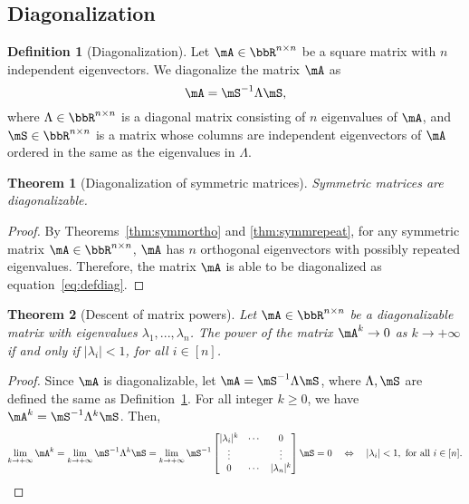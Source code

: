 \documentclass[11pt]{article}
\theoremstyle{plain}
\newtheorem{thm}{Theorem}[section]
\theoremstyle{definition}
\newtheorem{defn}{Definition}
\begin{document}
\subsection{Diagonalization}

\begin{defn}[Diagonalization]\label{def:diagonalization}
	Let  $\mA \in \bbR^{n \times n}$ be a square matrix with $n$ independent eigenvectors. We diagonalize the matrix $\mA$ as
	\begin{equation}\label{eq:defdiag}
		\mA = \mS^{-1} \Lambda \mS,
	\end{equation}
	where $\Lambda \in \bbR^{n \times n}$ is a diagonal matrix consisting of $n$ eigenvalues of $\mA$, and  $\mS \in \bbR^{n \times n}$ is a matrix whose columns are independent eigenvectors of $\mA$ ordered in the same as the eigenvalues in $\Lambda$.
\end{defn}

\begin{thm}[Diagonalization of symmetric matrices]
Symmetric matrices are diagonalizable.
\end{thm}

\begin{proof}
	By Theorems~\ref{thm:symmortho} and \ref{thm:symmrepeat}, for any symmetric matrix $\mA \in \bbR^{n \times n}$, $\mA$ has $n$ orthogonal eigenvectors with possibly repeated eigenvalues. Therefore, the matrix $\mA$   is able to be diagonalized as equation~\eqref{eq:defdiag}.
\end{proof}

\begin{thm}[Descent of matrix powers]
	Let $\mA \in \bbR^{n \times n}$ be  a diagonalizable matrix with eigenvalues $\lambda_1,...,\lambda_n$. The power of the matrix $\mA^k \rightarrow 0$ as $k \rightarrow +\infty$ if and only if $|\lambda_i| < 1$, for all $i \in [n]$.
\end{thm}

\begin{proof}
Since $\mA$ is diagonalizable, let $\mA =\mS^{-1} \Lambda \mS$, where $\Lambda, \mS$ are defined the same as Definition~\ref{def:diagonalization}. For all integer $k\geq 0$, we have $\mA^k = \mS^{-1} \Lambda^{k} \mS$. Then,
	\[ \lim_{k \rightarrow +\infty} \mA^k = \lim_{k \rightarrow +\infty} \mS^{-1} \Lambda^{k} \mS  =  \lim_{k \rightarrow +\infty} \mS^{-1} \begin{bmatrix}
		|\lambda_i|^k & \cdots &0\\
		\vdots & &\vdots\\
		0 & \cdots & |\lambda_n|^k
	\end{bmatrix} \mS  = 0 \quad \Leftrightarrow \quad  |\lambda_i| < 1, \text{ for all } i \in [n]. \]
\end{proof}
\end{document}

